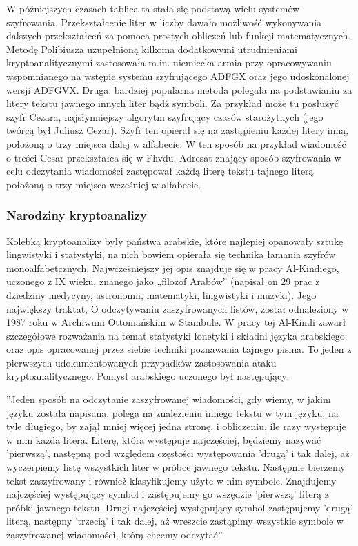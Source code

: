 \documentclass[10pt, a4paper, titlepage]{article}
\begin{document}
W późniejszych czasach tablica ta stała się podstawą wielu systemów szyfrowania. Przekształcenie liter w liczby dawało możliwość wykonywania dalszych przekształceń za pomocą prostych obliczeń lub funkcji matematycznych. Metodę Polibiusza uzupełnioną kilkoma dodatkowymi utrudnieniami kryptoanalitycznymi zastosowała m.in. niemiecka armia przy opracowywaniu wspomnianego na wstępie systemu szyfrującego ADFGX oraz jego udoskonalonej wersji ADFGVX. Druga, bardziej popularna metoda polegała na podstawianiu za litery tekstu jawnego innych liter bądź symboli. Za przykład może tu posłużyć szyfr Cezara, najsłynniejszy algorytm szyfrujący czasów starożytnych (jego twórcą był Juliusz Cezar). Szyfr ten opierał się na zastąpieniu każdej litery inną, położoną o trzy miejsca dalej w alfabecie. W ten sposób na przykład wiadomość o treści Cesar przekształca się w Fhvdu. Adresat znający sposób szyfrowania w celu odczytania wiadomości zastępował każdą literę tekstu tajnego literą położoną o trzy miejsca wcześniej w alfabecie.

\subsubsection{Narodziny kryptoanalizy}
Kolebką kryptoanalizy były państwa arabskie, które najlepiej opanowały sztukę lingwistyki i statystyki, na nich bowiem opierała się technika łamania szyfrów monoalfabetcznych. Najwcześniejszy jej opis znajduje się w pracy Al-Kindiego, uczonego z IX wieku, znanego jako „filozof Arabów” (napisał on 29 prac z dziedziny medycyny, astronomii, matematyki, lingwistyki i muzyki). Jego największy traktat, O odczytywaniu zaszyfrowanych listów, został odnaleziony w 1987 roku w Archiwum Ottomańskim w Stambule. W pracy tej Al-Kindi zawarł szczegółowe rozważania na temat statystyki fonetyki i składni języka arabskiego oraz opis opracowanej przez siebie techniki poznawania tajnego pisma. To jeden z pierwszych udokumentowanych przypadków zastosowania ataku kryptoanalitycznego. Pomysł arabskiego uczonego był następujący:\\
\begin{center}
”Jeden sposób na odczytanie zaszyfrowanej wiadomości, gdy wiemy, w jakim języku została napisana, polega na znalezieniu innego tekstu w tym języku, na tyle długiego, by zajął mniej więcej jedna stronę, i obliczeniu, ile razy występuje w nim każda litera. Literę, która występuje najczęściej, będziemy nazywać ’pierwszą’, następną pod względem częstości występowania ’drugą’ i tak dalej, aż wyczerpiemy listę wszystkich liter w próbce jawnego tekstu. Następnie bierzemy tekst zaszyfrowany i również klasyfikujemy użyte w nim symbole. Znajdujemy najczęściej występujący symbol i zastępujemy go wszędzie ’pierwszą’ literą z próbki jawnego tekstu. Drugi najczęściej występujący symbol zastępujemy ’drugą’ literą, następny ’trzecią’ i tak dalej, aż wreszcie zastąpimy wszystkie symbole w zaszyfrowanej wiadomości, którą chcemy odczytać”\cite{[2]}
\end{center}
\end{document}
